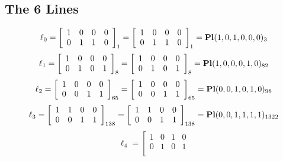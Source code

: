 \documentclass{article}
\begin{document}
{\subsection*{The 6 Lines}
$$
\ell_{0} = 
\left[
\begin{array}{*{4}{r}}
1 & 0 & 0 & 0\\
0 & 1 & 1 & 0\\
\end{array}
\right]
_{1}
=
\left[
\begin{array}{*{4}c}
1  & 0  & 0  & 0\\
0  & 1  & 1  & 0\\
\end{array}
\right]_{1}
={\rm\bf Pl}(1,0,1,0,0,0 )_{3}$$
$$
\ell_{1} = 
\left[
\begin{array}{*{4}{r}}
1 & 0 & 0 & 0\\
0 & 1 & 0 & 1\\
\end{array}
\right]
_{8}
=
\left[
\begin{array}{*{4}c}
1  & 0  & 0  & 0\\
0  & 1  & 0  & 1\\
\end{array}
\right]_{8}
={\rm\bf Pl}(1,0,0,0,1,0 )_{82}$$
$$
\ell_{2} = 
\left[
\begin{array}{*{4}{r}}
1 & 0 & 0 & 0\\
0 & 0 & 1 & 1\\
\end{array}
\right]
_{65}
=
\left[
\begin{array}{*{4}c}
1  & 0  & 0  & 0\\
0  & 0  & 1  & 1\\
\end{array}
\right]_{65}
={\rm\bf Pl}(0,0,1,0,1,0 )_{96}$$
$$
\ell_{3} = 
\left[
\begin{array}{*{4}{r}}
1 & 1 & 0 & 0\\
0 & 0 & 1 & 1\\
\end{array}
\right]
_{138}
=
\left[
\begin{array}{*{4}c}
1  & 1  & 0  & 0\\
0  & 0  & 1  & 1\\
\end{array}
\right]_{138}
={\rm\bf Pl}(0,0,1,1,1,1 )_{1322}$$
$$
\ell_{4} = 
\left[
\begin{array}{*{4}{r}}
1 & 0 & 1 & 0\\
0 & 1 & 0 & 1\\
\end{array}
$$}
\end{document}
